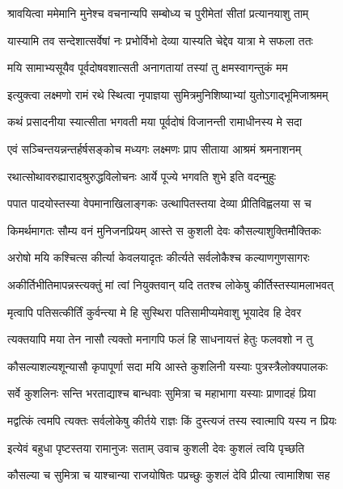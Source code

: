 \twolineshloka
{श्रावयित्वा ममेमानि मुनेश्च वचनान्यपि}
{सम्बोध्य च पुरीमेतां सीतां प्रत्यानयाशु ताम्}%


\twolineshloka
{यास्यामि तव सन्देशात्सर्वेषां नः प्रभोर्विभो}
{देव्या यास्यति चेद्देव यात्रा मे सफला ततः}%

\twolineshloka
{मयि सामाभ्यसूयैव पूर्वदोषवशात्सती}
{अनागतायां तस्यां तु क्षमस्वागन्तुकं मम}%

\twolineshloka
{इत्युक्त्वा लक्ष्मणो रामं रथे स्थित्वा नृपाज्ञया}
{सुमित्रमुनिशिष्याभ्यां युतोऽगाद्भूमिजाश्रमम्}%

\twolineshloka
{कथं प्रसादनीया स्यात्सीता भगवती मया}
{पूर्वदोषं विजानन्ती रामाधीनस्य मे सदा}%

\twolineshloka
{एवं सञ्चिन्तयन्नन्तर्हर्षसङ्कोच मध्यगः}
{लक्ष्मणः प्राप सीताया आश्रमं श्रमनाशनम्}%

\twolineshloka
{रथात्सोथावरुह्यारादश्रुरुद्धविलोचनः}
{आर्ये पूज्ये भगवति शुभे इति वदन्मुहुः}%

\twolineshloka
{पपात पादयोस्तस्या वेपमानाखिलाङ्गकः}
{उत्थापितस्तया देव्या प्रीतिविह्वलया स च}%

\twolineshloka
{किमर्थमागतः सौम्य वनं मुनिजनप्रियम्}
{आस्ते स कुशली देवः कौसल्याशुक्तिमौक्तिकः}%

\twolineshloka
{अरोषो मयि कश्चित्स कीर्त्या केवलयादृतः}
{कीर्त्यते सर्वलोकैश्च कल्याणगुणसागरः}%

\twolineshloka
{अकीर्तिभीतिमापन्नस्त्यक्तुं मां त्वां नियुक्तवान्}
{यदि ततश्च लोकेषु कीर्तिस्तस्यामलाभवत्}%

\twolineshloka
{मृत्वापि पतिसत्कीर्तिं कुर्वन्त्या मे हि सुस्थिरा}
{पतिसामीप्यमेवाशु भूयादेव हि देवर}%

\twolineshloka
{त्यक्तयापि मया तेन नासौ त्यक्तो मनागपि}
{फलं हि साधनायत्तं हेतुः फलवशो न तु}%

\twolineshloka
{कौसल्याशल्यशून्यासौ कृपापूर्णा सदा मयि}
{आस्ते कुशलिनी यस्याः पुत्रस्त्रैलोक्यपालकः}%

\twolineshloka
{सर्वे कुशलिनः सन्ति भरताद्याश्च बान्धवाः}
{सुमित्रा च महाभागा यस्याः प्राणादहं प्रिया}%

\twolineshloka
{मद्वत्किं त्वमपि त्यक्तः सर्वलोकेषु कीर्तये}
{राज्ञः किं दुस्त्यजं तस्य स्वात्मापि यस्य न प्रियः}%

\twolineshloka
{इत्येवं बहुधा पृष्टस्तया रामानुजः सताम्}
{उवाच कुशली देवः कुशलं त्वयि पृच्छति}%

\twolineshloka
{कौसल्या च सुमित्रा च याश्चान्या राजयोषितः}
{पप्रच्छुः कुशलं देवि प्रीत्या त्वामाशिषा सह}%

